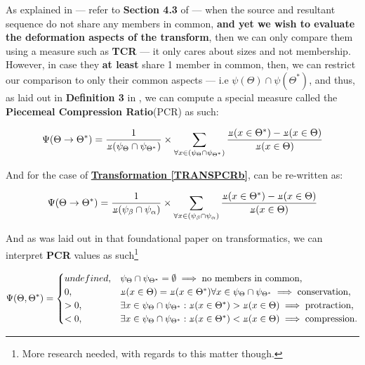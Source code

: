 \documentclass[a4paper, 18pt]{book} %
\newcommand{\invpi}{\rotatebox[origin=c]{180}{$\pi$}}
\begin{document}
As explained in \cite{transformatics} --- refer to \textbf{Section 4.3} of \cite{transformatics} --- when the source and resultant sequence do not share any members in common, \textbf{and yet we wish to evaluate the deformation aspects of the transform}, then we can only compare them using a measure such as \textbf{TCR} --- it only cares about sizes and not membership. However, in case they \textbf{at least} share 1 member in common, then, we can restrict our comparison to only their common aspects --- i.e $\psi(\Theta) \cap \psi(\Theta^*)$, and thus, as laid out in \textbf{Definition 3} in \cite{transformatics}, we can compute a special measure called the \textbf{Piecemeal Compression Ratio}(PCR) as such:

\vspace{1em}
\begin{equation}
\label{EQPCRb}
\Psi(\Theta \rightarrow \Theta^*) = \frac{1}{\invpi(\psi_\Theta \cap \psi_{\Theta^*})} \times \sum\limits_{\forall x \in (\psi_\Theta \cap \psi_{\Theta^*})} \frac{\invpi(x \in \Theta^*) - \invpi(x \in \Theta)}{\invpi(x \in \Theta)}
\end{equation}
\vspace{1em}

And for the case of \textbf{\hyperref[TRANSPCRb]{Transformation \ref{TRANSPCRb}}}, can be re-written as:

\vspace{1em}
\begin{equation}
\label{EQPCR2b}
\Psi(\Theta \rightarrow \Theta^*) = \frac{1}{\invpi(\psi_\beta \cap \psi_\alpha)} \times \sum\limits_{\forall x \in (\psi_\beta \cap \psi_\alpha)} \frac{\invpi(x \in \Theta^*) - \invpi(x \in \Theta)}{\invpi(x \in \Theta)}
\end{equation}
\vspace{1em}

And as was laid out in that foundational paper on transformatics\cite{transformatics}, we can interpret \textbf{PCR} values as such\footnote{More research needed, with regards to this matter though.}

\vspace{1em}
\begin{equation}
\label{EQPCRCASESb}
\Psi(\Theta,\Theta^*) = \begin{cases}
undefined, & \psi_\Theta \cap \psi_{\Theta^*} = \emptyset \implies \text{no members in common},\\
0, & \invpi(x \in \Theta) = \invpi(x \in \Theta^*) \forall x \in \psi_\Theta \cap \psi_{\Theta^*} \implies \text{conservation},\\
> 0, & \exists x \in \psi_\Theta \cap \psi_{\Theta^*}: \invpi(x \in \Theta^*) > \invpi(x \in \Theta) \implies \text{protraction},\\
< 0, & \exists x \in \psi_\Theta \cap \psi_{\Theta^*}: \invpi(x \in \Theta^*) < \invpi(x \in \Theta) \implies \text{compression}.
\end{cases}
\end{equation}
\vspace{1em}
\end{document}
